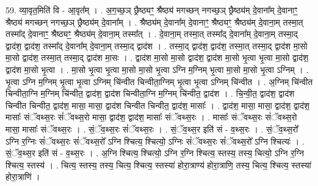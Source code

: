 \documentclass[17pt]{extarticle}
\begin{document}
59. व्या॒वृत॒मिति॑ वि - आ॒वृत᳚म् । . अ॒ग॒च्छ॒ञ् छ्रैष्ठ्यꣳ॒॒ श्रैष्ठ्य॑ मगच्छन् नगच्छ॒ञ् छ्रैष्ठ्य॑म् दे॒वाना᳚म् दे॒वानाꣳ॒॒ श्रैष्ठ्य॑ मगच्छन् नगच्छ॒ञ् छ्रैष्ठ्य॑म् दे॒वाना᳚म् । . श्रैष्ठ्य॑म् दे॒वाना᳚म् दे॒वानाꣳ॒॒ श्रैष्ठ्यꣳ॒॒ श्रैष्ठ्य॑म् दे॒वाना॒म् तस्मा॒त् तस्मा᳚द् दे॒वानाꣳ॒॒ श्रैष्ठ्यꣳ॒॒ श्रैष्ठ्य॑म् दे॒वाना॒म् तस्मा᳚त् । . दे॒वाना॒म् तस्मा॒त् तस्मा᳚द् दे॒वाना᳚म् दे॒वाना॒म् तस्मा॒द् द्वाद॑श॒ द्वाद॑श॒ तस्मा᳚द् दे॒वाना᳚म् दे॒वाना॒म् तस्मा॒द् द्वाद॑श । . तस्मा॒द् द्वाद॑श॒ द्वाद॑श॒ तस्मा॒त् तस्मा॒द् द्वाद॑श मा॒सो मा॒सो द्वाद॑श॒ तस्मा॒त् तस्मा॒द् द्वाद॑श मा॒सः । . द्वाद॑श मा॒सो मा॒सो द्वाद॑श॒ द्वाद॑श मा॒सो भृ॒त्वा भृ॒त्वा मा॒सो द्वाद॑श॒ द्वाद॑श मा॒सो भृ॒त्वा । . मा॒सो भृ॒त्वा भृ॒त्वा मा॒सो मा॒सो भृ॒त्वा ऽग्नि म॒ग्निम् भृ॒त्वा मा॒सो मा॒सो भृ॒त्वा ऽग्निम् । . भृ॒त्वा ऽग्नि म॒ग्निम् भृ॒त्वा भृ॒त्वा ऽग्निम् चि॑न्वीत चिन्वीता॒ग्निम् भृ॒त्वा भृ॒त्वा ऽग्निम् चि॑न्वीत । . अ॒ग्निम् चि॑न्वीत चिन्वीता॒ग्नि म॒ग्निम् चि॑न्वीत॒ द्वाद॑श॒ द्वाद॑श चिन्वीता॒ग्नि म॒ग्निम् चि॑न्वीत॒ द्वाद॑श । . चि॒न्वी॒त॒ द्वाद॑श॒ द्वाद॑श चिन्वीत चिन्वीत॒ द्वाद॑श॒ मासा॒ मासा॒ द्वाद॑श चिन्वीत चिन्वीत॒ द्वाद॑श॒ मासाः᳚ । . द्वाद॑श॒ मासा॒ मासा॒ द्वाद॑श॒ द्वाद॑श॒ मासाः᳚ संॅवथ्स॒रः सं॑ॅवथ्स॒रो मासा॒ द्वाद॑श॒ द्वाद॑श॒ मासाः᳚ संॅवथ्स॒रः । . मासाः᳚ संॅवथ्स॒रः सं॑ॅवथ्स॒रो मासा॒ मासाः᳚ संॅवथ्स॒रः । . सं॒ॅव॒थ्स॒रः सं॑ॅवथ्स॒रः । . सं॒ॅव॒थ्स॒र इति॑ सं - व॒थ्स॒रः । . सं॒ॅव॒थ्स॒रो᳚ ऽग्नि र॒ग्निः सं॑ॅवथ्स॒रः सं॑ॅवथ्स॒रो᳚ ऽग्नि श्चित्य॒ श्चित्यो॒ ऽग्निः सं॑ॅवथ्स॒रः सं॑ॅवथ्स॒रो᳚ ऽग्नि श्चित्यः॑ । . सं॒ॅव॒थ्स॒र इति॑ सं - व॒थ्स॒रः । . अ॒ग्नि श्चित्य॒ श्चित्यो॒ ऽग्नि र॒ग्नि श्चित्य॒ स्तस्य॒ तस्य॒ चित्यो॒ ऽग्नि र॒ग्नि श्चित्य॒ स्तस्य॑ । . चित्य॒ स्तस्य॒ तस्य॒ चित्य॒ श्चित्य॒ स्तस्या॑ होरा॒त्राण्य॑ होरा॒त्राणि॒ तस्य॒ चित्य॒ श्चित्य॒ स्तस्या॑ होरा॒त्राणि॑ । \newline
\end{document}
